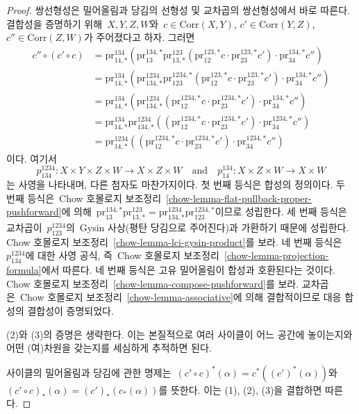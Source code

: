 \begin{proof}
쌍선형성은 밀어올림과 당김의 선형성 및 교차곱의 쌍선형성에서 바로
따른다. 결합성을 증명하기 위해\  $X, Y, Z, W$와\ 
$c \in \text{Corr}(X, Y)$,
$c' \in \text{Corr}(Y, Z)$,
$c'' \in \text{Corr}(Z, W)$가 주어졌다고 하자. 그러면
\begin{align*}
c'' \circ (c' \circ c)
& =
\text{pr}^{134}_{14, *}(
\text{pr}^{134, *}_{13}
\text{pr}^{123}_{13, *}(\text{pr}^{123, *}_{12}c \cdot
\text{pr}^{123, *}_{23}c')
\cdot \text{pr}^{134, *}_{34}c'') \\
& =
\text{pr}^{134}_{14, *}(
\text{pr}^{1234}_{134, *}
\text{pr}^{1234, *}_{123}(\text{pr}^{123, *}_{12}c \cdot
\text{pr}^{123, *}_{23}c')
\cdot \text{pr}^{134, *}_{34}c'') \\
& =
\text{pr}^{134}_{14, *}(
\text{pr}^{1234}_{134, *}
(\text{pr}^{1234, *}_{12}c \cdot
\text{pr}^{1234, *}_{23}c')
\cdot \text{pr}^{134, *}_{34}c'') \\
& =
\text{pr}^{134}_{14, *}
\text{pr}^{1234}_{134, *}
((\text{pr}^{1234, *}_{12}c \cdot
\text{pr}^{1234, *}_{23}c')
\cdot \text{pr}^{1234, *}_{34}c'') \\
& =
\text{pr}^{1234}_{14, *}(
(\text{pr}^{1234, *}_{12}c \cdot
\text{pr}^{1234, *}_{23}c') \cdot
\text{pr}^{1234, *}_{34}c'')
\end{align*}
이다. 여기서
$$
p^{1234}_{134} : X \times Y \times Z \times W \to X \times Z \times W
\quad\text{and}\quad
p^{134}_{14} : X \times Z \times W \to X \times W
$$
는 사영을 나타내며, 다른 첨자도 마찬가지이다.
첫 번째 등식은 합성의 정의이다. 두 번째 등식은\  Chow 호몰로지 보조정리\ 
\ref{chow-lemma-flat-pullback-proper-pushforward}에 의해\ 
$\text{pr}^{134, *}_{13} \text{pr}^{123}_{13, *} =
\text{pr}^{1234}_{134, *} \text{pr}^{1234, *}_{123}$이므로 성립한다.
세 번째 등식은 교차곱이\  $p^{1234}_{123}$의\  Gysin 사상(평탄 당김으로
주어진다)과 가환하기 때문에 성립한다. Chow 호몰로지 보조정리\ 
\ref{chow-lemma-lci-gysin-product}를 보라.
네 번째 등식은\  $p^{1234}_{134}$에 대한 사영 공식,
즉\  Chow 호몰로지 보조정리\  \ref{chow-lemma-projection-formula}에서
따른다. 네 번째 등식은 고유 밀어올림이 합성과 호환된다는 것이다.
Chow 호몰로지 보조정리\  \ref{chow-lemma-compose-pushforward}를 보라.
교차곱은\  Chow 호몰로지 보조정리\ 
\ref{chow-lemma-associative}에 의해 결합적이므로 대응 합성의
결합성이 증명되었다.

\medskip\noindent
(2)와 (3)의 증명은 생략한다. 이는 본질적으로 여러 사이클이 어느
공간에 놓이는지와 어떤 (여)차원을 갖는지를 세심하게 추적하면 된다.

\medskip\noindent
사이클의 밀어올림과 당김에 관한 명제는\ 
$(c' \circ c)^*(\alpha) = c^*((c')^*(\alpha))$와\ 
$(c' \circ c)_*(\alpha) = (c')_*(c_*(\alpha))$를 뜻한다.
이는 (1), (2), (3)을 결합하면 따른다.
\end{proof}

